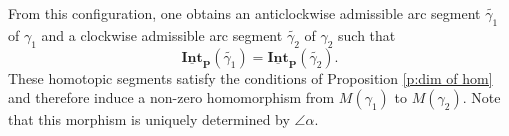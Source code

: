 \documentclass[a4paper,10pt]{amsart}
\theoremstyle{plain}          %
\theoremstyle{definition}
\def\PP{\mathbf{P}}
\newcommand{\Intv}{\underline{\mathbf{Int}}}
\begin{document}
From this configuration, one obtains an anticlockwise admissible arc segment $\widetilde{\gamma_1}$ of $\gamma_1$ and a clockwise admissible arc segment $\widetilde{\gamma_2}$ of $\gamma_2$ such that $$\Intv_{\PP}(\widetilde{\gamma_1}) = \Intv_{\PP}(\widetilde{\gamma_2}).$$ These homotopic segments satisfy the conditions of Proposition \ref{p:dim of hom} and therefore induce a non-zero homomorphism from $M(\gamma_1)$ to $M(\gamma_2)$. Note that this morphism is uniquely  determined by $\angle\alpha$.
\end{document}
